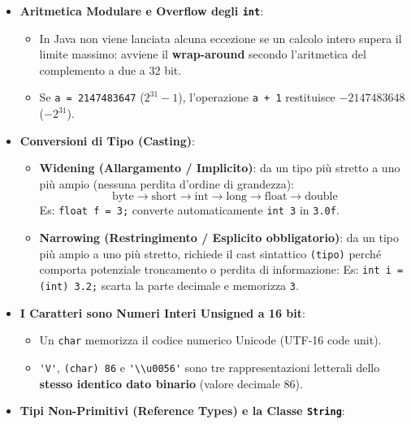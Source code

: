 \documentclass[11pt,a4paper,oneside]{report}
\newcommand{\passthrough}[1]{#1}
\providecommand{\tightlist}{\setlength{\itemsep}{0pt}\setlength{\parskip}{0pt}}
\begin{document}
\begin{itemize}
\tightlist
\item
  \textbf{Aritmetica Modulare e Overflow degli
  \passthrough{\lstinline!int!}}:

  \begin{itemize}
  \tightlist
  \item
    In Java non viene lanciata alcuna eccezione se un calcolo intero
    supera il limite massimo: avviene il \textbf{wrap-around} secondo
    l'aritmetica del complemento a due a 32 bit.
  \item
    Se \passthrough{\lstinline!a = 2147483647!} (\(2^{31}-1\)),
    l'operazione \passthrough{\lstinline!a + 1!} restituisce
    \(-2147483648\) (\(-2^{31}\)).
  \end{itemize}
\item
  \textbf{Conversioni di Tipo (Casting)}:

  \begin{itemize}
  \tightlist
  \item
    \textbf{Widening (Allargamento / Implicito)}: da un tipo più stretto
    a uno più ampio (nessuna perdita d'ordine di grandezza):
    \[\text{byte} \longrightarrow \text{short} \longrightarrow \text{int} \longrightarrow \text{long} \longrightarrow \text{float} \longrightarrow \text{double}\]
    Es: \passthrough{\lstinline!float f = 3;!} converte automaticamente
    \passthrough{\lstinline!int 3!} in \passthrough{\lstinline!3.0f!}.
  \item
    \textbf{Narrowing (Restringimento / Esplicito obbligatorio)}: da un
    tipo più ampio a uno più stretto, richiede il cast sintattico
    \passthrough{\lstinline!(tipo)!} perché comporta potenziale
    troncamento o perdita di informazione: Es:
    \passthrough{\lstinline!int i = (int) 3.2;!} scarta la parte
    decimale e memorizza \passthrough{\lstinline!3!}.
  \end{itemize}
\item
  \textbf{I Caratteri sono Numeri Interi Unsigned a 16 bit}:

  \begin{itemize}
  \tightlist
  \item
    Un \passthrough{\lstinline!char!} memorizza il codice numerico
    Unicode (UTF-16 code unit).
  \item
    \passthrough{\lstinline!'V'!}, \passthrough{\lstinline!(char) 86!} e
    \passthrough{\lstinline!'\\u0056'!} sono tre rappresentazioni
    letterali dello \textbf{stesso identico dato binario} (valore
    decimale 86).
  \end{itemize}
\item
  \textbf{Tipi Non-Primitivi (Reference Types) e la Classe
  \passthrough{\lstinline!String!}}:


\end{itemize}
\end{document}
